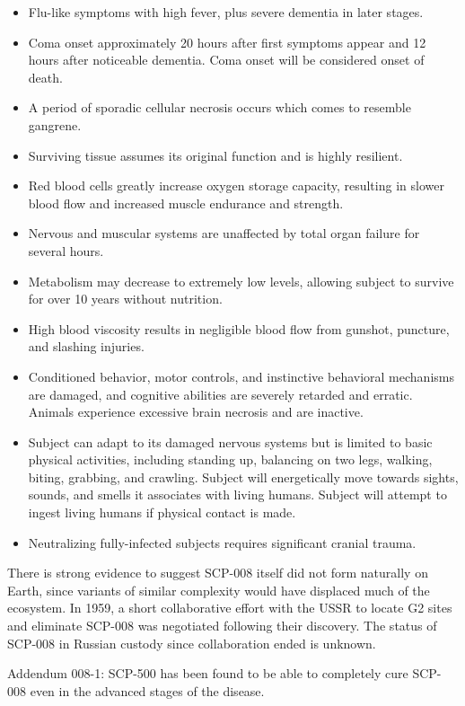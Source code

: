 \begin{itemize}
\item Flu-like symptoms with high fever, plus severe dementia in later stages.
\item Coma onset approximately 20 hours after first symptoms appear and 12 hours after noticeable dementia. Coma onset will be considered onset of death.
\item A period of sporadic cellular necrosis occurs which comes to resemble gangrene. \item Surviving tissue assumes its original function and is highly resilient.
\item Red blood cells greatly increase oxygen storage capacity, resulting in slower blood flow and increased muscle endurance and strength.
\item Nervous and muscular systems are unaffected by total organ failure for several hours.
\item Metabolism may decrease to extremely low levels, allowing subject to survive for over 10 years without nutrition.
\item High blood viscosity results in negligible blood flow from gunshot, puncture, and slashing injuries.
\item Conditioned behavior, motor controls, and instinctive behavioral mechanisms are damaged, and cognitive abilities are severely retarded and erratic. Animals experience excessive brain necrosis and are inactive.
\item Subject can adapt to its damaged nervous systems but is limited to basic physical activities, including standing up, balancing on two legs, walking, biting, grabbing, and crawling. Subject will energetically move towards sights, sounds, and smells it associates with living humans. Subject will attempt to ingest living humans if physical contact is made.
\item Neutralizing fully-infected subjects requires significant cranial trauma.
\end{itemize}
There is strong evidence to suggest SCP-008 itself did not form naturally on Earth, since variants of similar complexity would have displaced much of the ecosystem. In 1959, a short collaborative effort with the USSR to locate G2 sites and eliminate SCP-008 was negotiated following their discovery. The status of SCP-008 in Russian custody since collaboration ended is unknown.

Addendum 008-1: SCP-500 has been found to be able to completely cure SCP-008 even in the advanced stages of the disease.